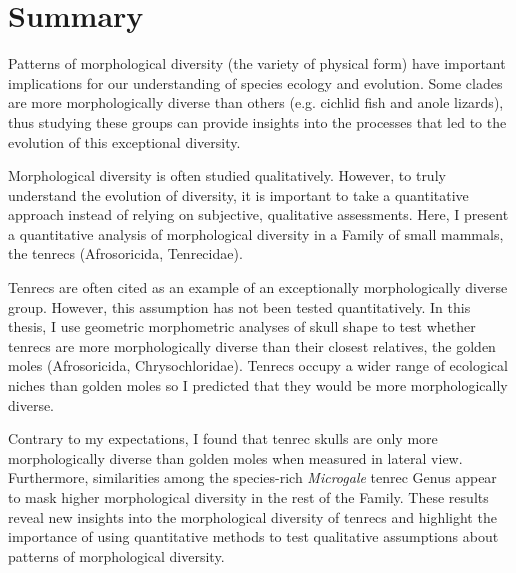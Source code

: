 \chapter*{Summary}


	Patterns of morphological diversity (the variety of physical form) have important implications for our understanding of species ecology and evolution. Some clades are more morphologically diverse than others (e.g. cichlid fish and anole lizards), thus studying these groups can provide insights into the processes that led to the evolution of this exceptional diversity. 

	Morphological diversity is often studied qualitatively. However, to truly understand the evolution of diversity, it is important to take a quantitative approach instead of relying on subjective, qualitative assessments. Here, I present a quantitative analysis of morphological diversity in a Family of small mammals, the tenrecs (Afrosoricida, Tenrecidae). 
	
	Tenrecs are often cited as an example of an exceptionally morphologically diverse group. However, this assumption has not been tested quantitatively. In this thesis, I use geometric morphometric analyses of skull shape to test whether tenrecs are more morphologically diverse than their closest relatives, the golden moles (Afrosoricida, Chrysochloridae). Tenrecs occupy a wider range of ecological niches than golden moles so I predicted that they would be more morphologically diverse. 
	
	Contrary to my expectations, I found that tenrec skulls are only more morphologically diverse than golden moles when measured in lateral view. Furthermore, similarities among the species-rich \textit{Microgale} tenrec Genus appear to mask higher morphological diversity in the rest of the Family. These results reveal new insights into the morphological diversity of tenrecs and highlight the importance of using quantitative methods to test qualitative assumptions about patterns of morphological diversity. 

	
